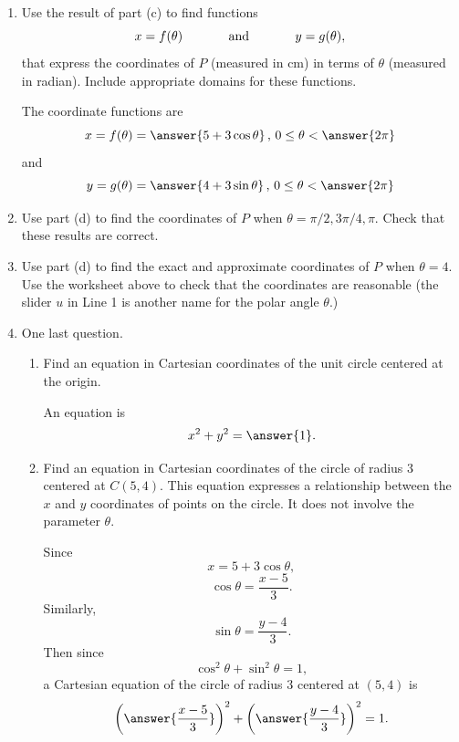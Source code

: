 \documentclass{ximera}
\begin{document}
\begin{question}
\begin{explanation}
\begin{enumerate}
\[ 
     \overrightarrow{OP} =  \langle \answer{5 + 3\cos\theta} , \answer{4 + 3\sin\theta} \rangle \, , \, 0\leq \theta < 2\pi.
\]

\item Use the result of part (c) to find functions
\[
    x = f(\theta)  \hskip 0.5 in \text{and} \hskip 0.5in  y=g(\theta) ,
\]
that express the coordinates of $P$ (measured in cm) in terms of $\theta$ (measured in radian). Include appropriate domains for these functions. 

The coordinate functions are
\[
 x = f(\theta) = \answer{5 + 3\cos\theta} \, , \, 0\leq \theta < \answer{2\pi}
\]
and
\[
  y =g(\theta) = \answer{4 + 3\sin\theta} \, , \, 0\leq \theta < \answer{2\pi}
\]

\item Use part (d) to find the coordinates of $P$ when $\theta=\pi/2, 3\pi/4, \pi$. Check that these results are correct.

\item Use part (d) to find the exact and approximate coordinates of $P$ when $\theta =4$. Use the worksheet above to check that the coordinates are reasonable (the slider $u$ in Line 1 is another name for the polar angle $\theta$.) 


\item One last question. 

\begin{enumerate}
\item Find an equation in Cartesian coordinates of the unit circle centered at the origin.

An equation is
\[
     x^2 + y^2 = \answer{1}.
\]

\item Find an equation in Cartesian coordinates of the circle of radius $3$ centered at  $C(5,4)$. This equation expresses a relationship between the $x$ and $y$ coordinates of points on the circle. It does not involve the parameter $\theta$. 

Since 
\[
 x = 5 + 3\cos\theta,
\]
\[
   \cos\theta = \frac{x-5}{3}.
\]
Similarly,
\[
  \sin\theta = \frac{y-4}{3}.
\]
Then since
\[
  \cos^2\theta + \sin^2 \theta = 1,
\]
a Cartesian equation of the circle of radius $3$ centered at $(5,4)$ is
\[
  \left( \answer{\frac{x-5}{3}} \right)^2 + \left( \answer{\frac{y-4}{3}} \right)^2 = 1.
\]

\end{enumerate}
\end{enumerate}

\end{explanation}
\end{question}
\end{document}
